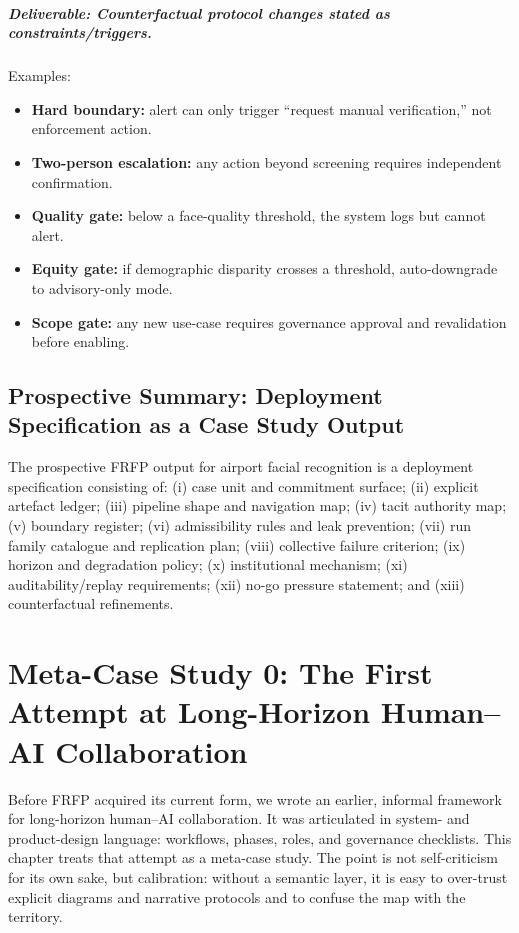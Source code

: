 \paragraph{Deliverable: Counterfactual protocol changes stated as constraints/triggers.}

Examples:
\begin{itemize}
  \item \textbf{Hard boundary:} alert can only trigger “request manual verification,” not enforcement action.
  \item \textbf{Two-person escalation:} any action beyond screening requires independent confirmation.
  \item \textbf{Quality gate:} below a face-quality threshold, the system logs but cannot alert.
  \item \textbf{Equity gate:} if demographic disparity crosses a threshold, auto-downgrade to advisory-only mode.
  \item \textbf{Scope gate:} any new use-case requires governance approval and revalidation before enabling.
\end{itemize}

\section{Prospective Summary: Deployment Specification as a Case Study Output}

The prospective FRFP output for airport facial recognition is a deployment specification consisting of:
(i) case unit and commitment surface; (ii) explicit artefact ledger; (iii) pipeline shape and navigation map;
(iv) tacit authority map; (v) boundary register; (vi) admissibility rules and leak prevention; (vii) run family catalogue
and replication plan; (viii) collective failure criterion; (ix) horizon and degradation policy; (x) institutional mechanism;
(xi) auditability/replay requirements; (xii) no-go pressure statement; and (xiii) counterfactual refinements.


\chapter{Meta-Case Study 0: The First Attempt at Long-Horizon Human--AI Collaboration}
\label{ch:meta-case-0}

Before FRFP acquired its current form, we wrote an earlier, informal framework for long-horizon human--AI collaboration. It was articulated in system- and product-design language: workflows, phases, roles, and governance checklists. This chapter treats that attempt as a meta-case study. The point is not self-criticism for its own sake, but calibration: without a semantic layer, it is easy to over-trust explicit diagrams and narrative protocols and to confuse the map with the territory.

